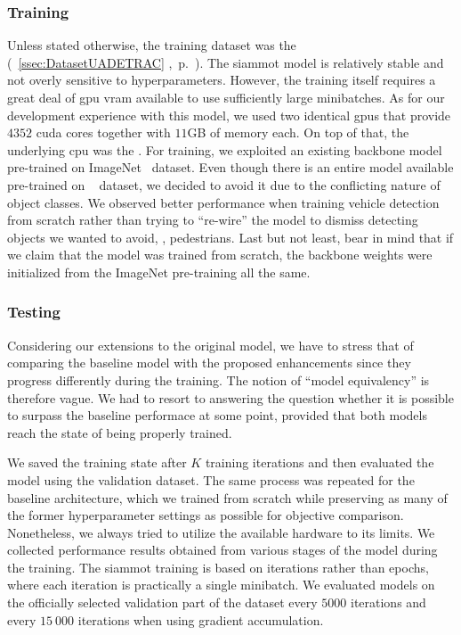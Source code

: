 \subsubsection{Training}

Unless stated otherwise, the training dataset was the \uadetrac{} (\sectiontext{}~\ref{ssec:DatasetUADETRAC} ,~p.~\pageref{ssec:DatasetUADETRAC}). The \gls{siammot} model is relatively stable and not overly sensitive to hyperparameters. However, the training itself requires a great deal of \gls{gpu} \gls{vram} available to use sufficiently large minibatches. As for our development experience with this model, we used two identical \usedgpu{} \glspl{gpu} that provide $4352$ \gls{cuda} cores together with $11$GB of memory each. On top of that, the underlying \gls{cpu} was the \usedcpu{}. For training, we exploited an existing backbone model pre-trained on ImageNet~\cite{deng2009imagenet} dataset. Even though there is an entire model available pre-trained on \mscoco{}~\cite{lin2014mscoco} dataset, we decided to avoid it due to the conflicting nature of object classes. We observed better performance when training vehicle detection from scratch rather than trying to ``re-wire'' the model to dismiss detecting objects we wanted to avoid, \egtext{}, pedestrians. Last but not least, bear in mind that if we claim that the model was trained from scratch, the backbone weights were initialized from the ImageNet pre-training all the same.

\subsubsection{Testing}

Considering our extensions to the original model, we have to stress that of comparing the baseline model with the proposed enhancements since they progress differently during the training. The notion of ``model equivalency'' is therefore vague. We had to resort to answering the question whether it is possible to surpass the baseline performace at some point, provided that both models reach the state of being properly trained.

We saved the training state after $K$ training iterations and then evaluated the model using the \uadetrac{} validation dataset. The same process was repeated for the baseline architecture, which we trained from scratch while preserving as many of the former hyperparameter settings as possible for objective comparison. Nonetheless, we always tried to utilize the available hardware to its limits. We collected performance results obtained from various stages of the model during the training. The \gls{siammot} training is based on iterations rather than epochs, where each iteration is practically a single minibatch. We evaluated models on the officially selected validation part of the dataset every $5000$ iterations and every $15\ 000$ iterations when using gradient accumulation.
